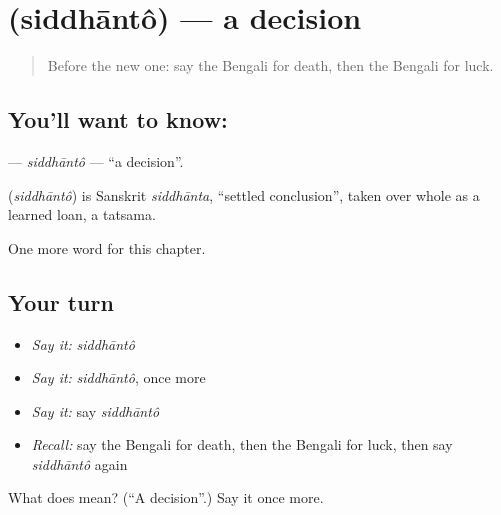 \section[\texorpdfstring{\bn{সিদ্ধান্ত} (siddhāntô)}{সিদ্ধান্ত (siddhāntô)}]{ (siddhāntô) — a decision}

\label{lesson:BN-C228-siddhanto}



\begin{quote}
Before the new one: say the Bengali for death, then the Bengali for luck.
\end{quote}

\subsection*{You'll want to know: }
\textbf{} — \emph{siddhāntô} — \textquotedblleft{}a decision\textquotedblright{}.

\begin{cousinweb}
\textbf{} (\emph{siddhāntô}) is Sanskrit \emph{siddhānta}, \textquotedblleft{}settled conclusion\textquotedblright{}, taken over whole as a learned loan, a tatsama.
\end{cousinweb}

\begin{grammarlens}[title={What you've built}]
One more word for this chapter.
\end{grammarlens}

\subsection*{Your turn}
\begin{itemize}
\raggedright
  \item \emph{Say it:} \emph{siddhāntô}
  \item \emph{Say it:} \emph{siddhāntô}, once more
  \item \emph{Say it:} say \emph{siddhāntô}
  \item \emph{Recall:} say the Bengali for death, then the Bengali for luck, then say \emph{siddhāntô} again
\end{itemize}

\begin{tcolorbox}[breakable,colback=teal!4,colframe=teal!35!black,title={Before you move on}]
What does  mean? (\textquotedblleft{}A decision\textquotedblright{}.) Say it once more.
\end{tcolorbox}
